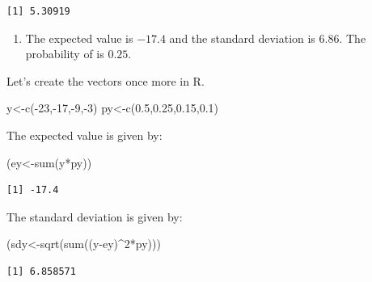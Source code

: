 \documentclass[
  letterpaper,
  DIV=11,
  numbers=noendperiod]{scrreprt}
\newenvironment{Shaded}{\begin{snugshade}}{\end{snugshade}}
\newcommand{\DecValTok}[1]{\textcolor[rgb]{0.68,0.00,0.00}{#1}}
\newcommand{\FloatTok}[1]{\textcolor[rgb]{0.68,0.00,0.00}{#1}}
\newcommand{\FunctionTok}[1]{\textcolor[rgb]{0.28,0.35,0.67}{#1}}
\newcommand{\NormalTok}[1]{\textcolor[rgb]{0.00,0.23,0.31}{#1}}
\newcommand{\OtherTok}[1]{\textcolor[rgb]{0.00,0.23,0.31}{#1}}
\newcommand{\SpecialCharTok}[1]{\textcolor[rgb]{0.37,0.37,0.37}{#1}}
\providecommand{\tightlist}{%
  \setlength{\itemsep}{0pt}\setlength{\parskip}{0pt}}\usepackage{longtable,booktabs,array}
\begin{document}
\begin{verbatim}
[1] 5.30919
\end{verbatim}

\begin{enumerate}
\def\labelenumi{\arabic{enumi}.}
\setcounter{enumi}{1}
\tightlist
\item
  The expected value is \(-17.4\) and the standard deviation is
  \(6.86\). The probability of is \(0.25\).
\end{enumerate}

Let's create the vectors once more in R.

\begin{Shaded}
\begin{Highlighting}[numbers=left,,]
\NormalTok{y}\OtherTok{\textless{}{-}}\FunctionTok{c}\NormalTok{(}\SpecialCharTok{{-}}\DecValTok{23}\NormalTok{,}\SpecialCharTok{{-}}\DecValTok{17}\NormalTok{,}\SpecialCharTok{{-}}\DecValTok{9}\NormalTok{,}\SpecialCharTok{{-}}\DecValTok{3}\NormalTok{)}
\NormalTok{py}\OtherTok{\textless{}{-}}\FunctionTok{c}\NormalTok{(}\FloatTok{0.5}\NormalTok{,}\FloatTok{0.25}\NormalTok{,}\FloatTok{0.15}\NormalTok{,}\FloatTok{0.1}\NormalTok{)}
\end{Highlighting}
\end{Shaded}

The expected value is given by:

\begin{Shaded}
\begin{Highlighting}[numbers=left,,]
\NormalTok{(ey}\OtherTok{\textless{}{-}}\FunctionTok{sum}\NormalTok{(y}\SpecialCharTok{*}\NormalTok{py))}
\end{Highlighting}
\end{Shaded}

\begin{verbatim}
[1] -17.4
\end{verbatim}

The standard deviation is given by:

\begin{Shaded}
\begin{Highlighting}[numbers=left,,]
\NormalTok{(sdy}\OtherTok{\textless{}{-}}\FunctionTok{sqrt}\NormalTok{(}\FunctionTok{sum}\NormalTok{((y}\SpecialCharTok{{-}}\NormalTok{ey)}\SpecialCharTok{\^{}}\DecValTok{2}\SpecialCharTok{*}\NormalTok{py)))}
\end{Highlighting}
\end{Shaded}

\begin{verbatim}
[1] 6.858571
\end{verbatim}
\end{document}
